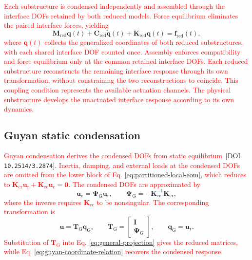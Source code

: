 \documentclass[11pt,a4paper]{article}
\numberwithin{equation}{section}
\newcommand{\rev}[1]{\textcolor{red}{#1}}
\begin{document}
\rev{Each substructure is condensed independently and assembled through the interface DOFs retained by both reduced models. Force equilibrium eliminates the paired interface forces, yielding}
\begin{equation}
	\mathbf{M}_{\mathrm{red}}\ddot{\bm{q}}(t)
	+\mathbf{C}_{\mathrm{red}}\dot{\bm{q}}(t)
	+\mathbf{K}_{\mathrm{red}}\bm{q}(t)
	=\bm{f}_{\mathrm{red}}(t),
	\label{eq:assembled-reduced}
\end{equation}
\rev{where \(\bm{q}(t)\) collects the generalized coordinates of both reduced substructures, with each shared interface DOF counted once. Assembly enforces compatibility and force equilibrium only at the common retained interface DOFs. Each reduced substructure reconstructs the remaining interface response through its own transformation, without constraining the two reconstructions to coincide. This coupling condition represents the available actuation channels. The physical substructure develops the unactuated interface response according to its own dynamics.}

\subsection{Guyan static condensation} \label{sec21}

\rev{Guyan condensation derives the condensed DOFs from static equilibrium} \cite{Guyan1965}\,[DOI \nolinkurl{10.2514/3.2874}]. \rev{Inertia, damping, and external loads at the condensed DOFs are omitted from the lower block of Eq. \eqref{eq:partitioned-local-eom}, which reduces to \(\mathbf{K}_{\mathrm{cr}}\bm{u}_{\mathrm{r}}+\mathbf{K}_{\mathrm{cc}}\bm{u}_{\mathrm{c}}=\bm{0}\). The condensed DOFs are approximated by}
\begin{equation}
	\bm{u}_{\mathrm{c}}=\bm{\Psi}_{\mathrm{G}}\bm{u}_{\mathrm{r}},
	\qquad
	\bm{\Psi}_{\mathrm{G}}=-\mathbf{K}_{\mathrm{cc}}^{-1}\mathbf{K}_{\mathrm{cr}},
	\label{eq:guyan-coordinate-relation}
\end{equation}
\rev{where the inverse requires \(\mathbf{K}_{\mathrm{cc}}\) to be nonsingular.}
\rev{The corresponding transformation is}
\begin{equation}
	\bm{u}=\mathbf{T}_{\mathrm{G}}\bm{q}_{\mathrm{G}},
	\qquad
	\mathbf{T}_{\mathrm{G}}=
	\begin{bmatrix}
		\mathbf{I}\\
		\bm{\Psi}_{\mathrm{G}}
	\end{bmatrix},
	\qquad
	\bm{q}_{\mathrm{G}}=\bm{u}_{\mathrm{r}}.
	\label{eq:guyan-transformation}
\end{equation}
\rev{Substitution of \(\mathbf{T}_{\mathrm{G}}\) into Eq. \eqref{eq:general-projection} gives the reduced matrices, while Eq. \eqref{eq:guyan-coordinate-relation} recovers the condensed response.}
\end{document}
